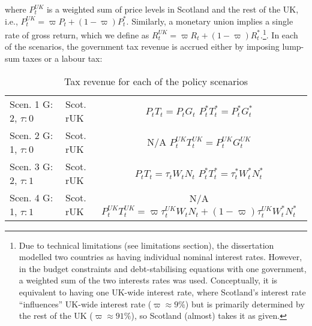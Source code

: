 where $P^{UK}_t$ is a weighted sum of price levels in Scotland and the rest of the UK, i.e., $P^{UK}_t = \varpi P_t + (1-\varpi)P^*_t$. Similarly, a monetary union implies a single rate of gross return, which we define as $R^{UK}_t = \varpi R_t + (1-\varpi)R^*_t$.\footnote{Due to technical limitations (see limitations section), the dissertation modelled two countries as having individual nominal interest rates. However, in the budget constraints and debt-stabilising equations with one government, a weighted sum of the two interests rates was used. Conceptually, it is equivalent to having one UK-wide interest rate, where Scotland's interest rate ``influences'' UK-wide interest rate ($\varpi \approx 9\%$) but is primarily determined by the rest of the UK ($\varpi \approx 91\%$), so Scotland (almost) takes it as given.}. In each of the scenarios, the government tax revenue is accrued either by imposing lump-sum taxes or a labour tax:
\begin{table}[H]
    \renewcommand{\arraystretch}{2}
    \centering
    \begin{tabular}{l|l|c}
    \makecell{Scen. 1 \\ G: 2, $\tau: 0$} & \makecell{Scot. \\ rUK } & 
        \makecell{
            $P_t T_t = P_tG_t$\\
            $ P^*_tT^*_t = P^*_tG^*_t $
        }  \\ 
    \makecell{Scen. 2 \\ G: 1, $\tau: 0$} & \makecell{Scot. \\ rUK } & 
        \makecell{
            N/A\\
            $P^{UK}_tT^{UK}_t = P^{UK}_tG^{UK}_t$
        }   \\ 
    \makecell{Scen. 3 \\ G: 2, $\tau: 1$} & \makecell{Scot. \\ rUK } & 
    \makecell{
        $P_tT_t = \tau_tW_t N_t$\\ 
        $P^*_tT^*_t = \tau^*_tW^*_t N^*_t$
    }  \\
    \makecell{Scen. 4 \\ G: 1, $\tau: 1$} & \makecell{Scot. \\ rUK } & 
    \makecell{
        N/A \\
        $P^{UK}_tT^{UK}_t = \varpi\tau^{UK}_tW_t N_t + (1-\varpi)\tau^{UK}_tW^*_t N^*_t$
    }  
    \end{tabular}
    \caption{Tax revenue for each of the policy scenarios}
\end{table}
